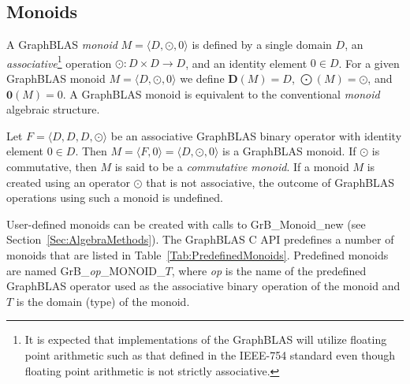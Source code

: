 \subsection{Monoids}

A GraphBLAS \emph{monoid} $M =
\langle D,\odot,0 \rangle$ is defined by a single domain $D$, an 
\emph{associative}\footnote{\label{Foot:associative}It is expected 
that implementations of the GraphBLAS will utilize floating point arithmetic 
such as that defined in the IEEE-754 standard even though
floating point arithmetic is not strictly associative.} 
operation $\odot: D \times D \rightarrow D$,
and an identity element $0 \in D$.  For a given GraphBLAS monoid $M=\langle
D,\odot,0 \rangle$ we define $\mathbf{D}(M) = D$, $\mathbf{\bigodot}(M) =
\odot$, and $\mathbf{0}(M) = 0$.  A GraphBLAS monoid is equivalent to 
the conventional \emph{monoid} algebraic structure.

Let $F = \langle D,D,D,\odot \rangle$ be an associative GraphBLAS binary operator
with identity element $0 \in D$.  Then $M = \langle F,0 \rangle = \langle
D,\odot,0 \rangle$ is a GraphBLAS monoid. If $\odot$ is commutative,
then $M$ is said to be a \emph{commutative monoid}.
If a monoid $M$ is created using an operator $\odot$ that is
not associative, the outcome of GraphBLAS operations using such a monoid is undefined.

User-defined monoids can be created with calls to {\sf GrB\_Monoid\_new} 
(see Section~\ref{Sec:AlgebraMethods}).
The GraphBLAS C API predefines a number of monoids that are listed 
in Table~\ref{Tab:PredefinedMonoids}.  Predefined monoids are named {\sf
GrB\_\emph{op}\_MONOID\_$T$}, where \emph{op} is the name of the
predefined GraphBLAS operator used as the associative binary operation
of the monoid and $T$ is the domain (type) of the monoid.


